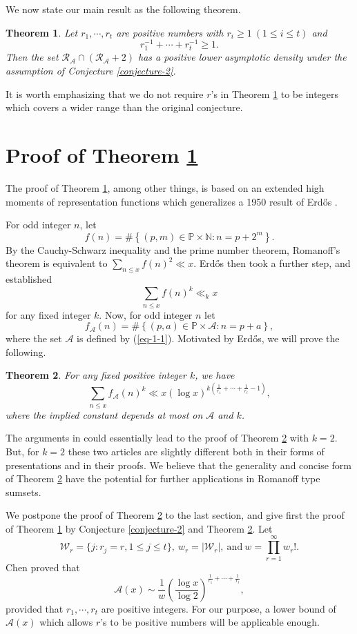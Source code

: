 \documentclass[12pt,a4paper,reqno]{amsart}
\numberwithin{equation}{section}
\theoremstyle{plain}
\newtheorem{theorem}{Theorem}
\theoremstyle{definition}
\begin{document}
We now state our main result as the following theorem. 

\begin{theorem}\label{theorem-1}
Let $r_1,\cdots, r_t$ are positive numbers with $r_i\ge 1~(1\le i\le t)$ and 
$$
r_1^{-1}+\cdots+r_t^{-1}\ge 1.
$$
 Then
 the set $\mathcal{R}_{\mathcal{A}}\cap(\mathcal{R}_{\mathcal{A}}+2)$ has a positive lower asymptotic density under the assumption of Conjecture \ref{conjecture-2}.
\end{theorem}

It is worth emphasizing that we do not require $r$'s in Theorem \ref{theorem-1} to be integers which covers a wider range than the original conjecture.

\section{Proof of Theorem \ref{theorem-1}}
The proof of Theorem \ref{theorem-1}, among other things, is based on an extended high moments of representation functions which generalizes a 1950 result of Erd\H os \cite{Erdos2}.

For odd integer $n$, let
$$
f(n)=\#\left\{(p,m)\in \mathbb{P}\times \mathbb{N}:n=p+2^m\right\}.
$$
By the Cauchy-Schwarz inequality and the prime number theorem, Romanoff's theorem is equivalent to
$
\sum_{n\le x}f(n)^2\ll x.
$
 Erd\H os \cite{Erdos2} then took a further step, and established
$$
\sum_{n\le x}f(n)^k\ll_k x
$$
for any fixed integer $k$. Now, for odd integer $n$ let
$$
f_{\mathcal{A}}(n)=\#\left\{(p,a)\in \mathbb{P}\times \mathcal{A}:n=p+a\right\},
$$
where the set $\mathcal{A}$ is defined by (\ref{eq-1-1}). Motivated by Erd\H os, we will prove the following.

\begin{theorem}\label{propo:2}
For any fixed positive integer $k$, we have
$$
\sum_{n\le x}f_{\mathcal{A}}(n)^k\ll x (\log x)^{k\left(\frac{1}{r_1}+\cdots+\frac{1}{r_t}-1\right)},
$$
where the implied constant depends at most on $\mathcal{A}$ and $k$.
\end{theorem}

The arguments in \cite{Chen-Xu, Ding-Zhai} could essentially lead to the proof of Theorem \ref{propo:2} with $k=2$. But, for $k=2$ these two articles are slightly different both in their forms of presentations and in their proofs. We believe that the generality and concise form of Theorem \ref{propo:2} have the potential for further applications in Romanoff type sumsets.

We postpone the proof of Theorem \ref{propo:2} to the last section, and give first the proof of Theorem \ref{theorem-1} by Conjecture \ref{conjecture-2} and Theorem \ref{propo:2}. 
Let 
$$
\mathcal{W}_r=\{j: r_j=r, 1\le j\le t\},\ w_r=|\mathcal{W}_r|,\ \text{and}~w=\prod_{r=1}^{\infty}w_r!.
$$
Chen \cite[Lemma 2.1]{Chen-new} proved that
$$
\mathcal{A}(x)\sim \frac{1}{w}\left(\frac{\log x}{\log 2}\right)^{\frac{1}{r_1}+\cdots+\frac{1}{r_t}},
$$
provided that $r_1,\cdots, r_t$ are positive integers. For our purpose, a lower bound of $\mathcal{A}(x)$ which allows $r$'s to be positive numbers will be applicable enough.
\end{document}
